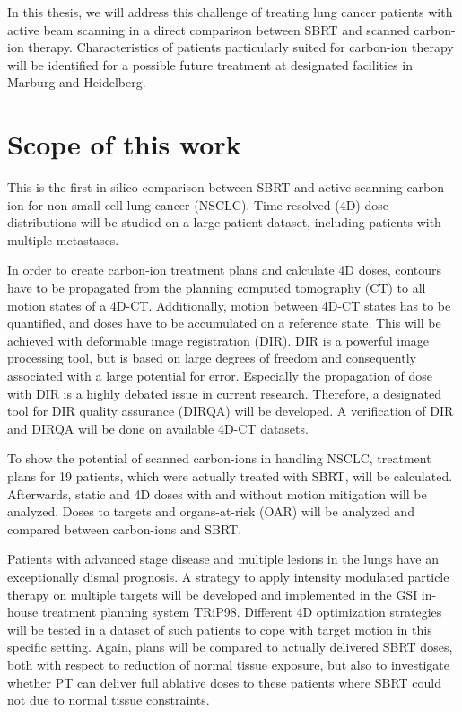In this thesis, we will address this challenge of treating lung cancer patients with active beam scanning in a direct comparison between SBRT 
and scanned carbon-ion therapy. Characteristics of patients particularly suited for carbon-ion therapy will be identified for a possible future treatment at designated facilities in Marburg and Heidelberg.


\newpage

\section*{Scope of this work}

This is the first in silico comparison between SBRT and active scanning carbon-ion for non-small cell lung cancer (NSCLC). 
Time-resolved (4D) dose distributions will be studied on a large patient dataset, including patients with multiple metastases.

In order to create carbon-ion treatment plans and calculate 4D doses, contours have to be propagated from the planning computed tomography (CT)
to all motion states of a  4D-CT. Additionally, motion between 4D-CT states has to be quantified, and doses have to be accumulated on a reference state. 
This will be achieved with deformable image registration (DIR). DIR is a powerful image processing tool, but is based on large degrees of freedom and 
consequently associated with a large potential for error. Especially the propagation of dose with DIR is a highly debated issue in current research. 
Therefore, a designated tool for DIR quality assurance (DIRQA) will be developed. A verification of DIR and DIRQA will be done on available 4D-CT datasets.

To show the potential of scanned carbon-ions in handling NSCLC, treatment plans for 19 patients, which were actually treated with SBRT, will be calculated. 
Afterwards, static and 4D doses with and without motion mitigation will be analyzed. Doses to targets and organs-at-risk (OAR) will be analyzed and compared between carbon-ions and SBRT.

Patients with advanced stage disease and multiple lesions in the lungs have an exceptionally dismal prognosis. A strategy to apply intensity modulated particle therapy on
multiple targets will be developed and implemented in the GSI in-house treatment planning system TRiP98. Different 4D optimization strategies will be tested in a dataset of 
such patients to cope with target motion in this specific setting. Again, plans will be compared to actually delivered SBRT doses, both with respect to reduction of normal 
tissue exposure, but also to investigate whether PT can deliver full ablative doses to these patients where SBRT could not due to normal tissue constraints.

